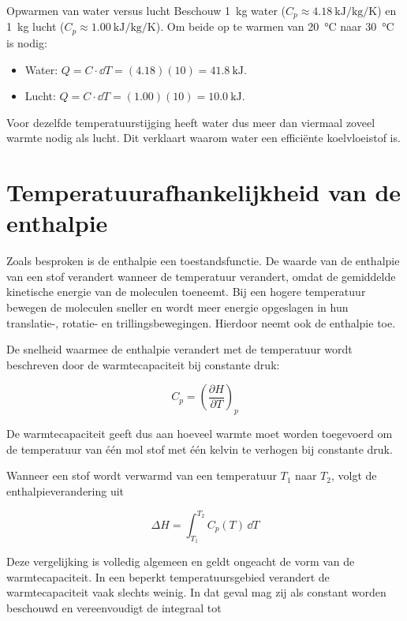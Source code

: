 \begin{voorbeeld}{Opwarmen van water versus lucht}
Beschouw \SI{1}{\kilogram} water ($C_p \approx \SI{4.18}{\kilo\joule\per\kilogram\per\kelvin}$) en \SI{1}{\kilogram} lucht ($C_p \approx \SI{1.00}{\kilo\joule\per\kilogram\per\kelvin}$). Om beide op te warmen van \SI{20}{\celsius} naar \SI{30}{\celsius} is nodig:
\begin{itemize}
\item Water: $Q = C \cdot \dd T = (4.18)(10) = \SI{41.8}{\kilo\joule}$.
\item Lucht: $Q = C \cdot \dd T = (1.00)(10) = \SI{10.0}{\kilo\joule}$.
\end{itemize}
Voor dezelfde temperatuurstijging heeft water dus meer dan viermaal zoveel warmte nodig als lucht. Dit verklaart waarom water een effici\"ente koelvloeistof is.
\end{voorbeeld}

\section{Temperatuurafhankelijkheid van de enthalpie}

Zoals besproken is de enthalpie een toestandsfunctie. De waarde van de enthalpie van een stof verandert wanneer de temperatuur verandert, omdat de gemiddelde kinetische energie van de moleculen toeneemt. Bij een hogere temperatuur bewegen de moleculen sneller en wordt meer energie opgeslagen in hun translatie-, rotatie- en trillingsbewegingen. Hierdoor neemt ook de enthalpie toe.

De snelheid waarmee de enthalpie verandert met de temperatuur wordt beschreven door de warmtecapaciteit bij constante druk:

\begin{equation}
C_p=\left(\frac{\partial H}{\partial T}\right)_p
\end{equation}

De warmtecapaciteit geeft dus aan hoeveel warmte moet worden toegevoerd om de temperatuur van één mol stof met één kelvin te verhogen bij constante druk.

Wanneer een stof wordt verwarmd van een temperatuur $T_1$ naar $T_2$, volgt de enthalpieverandering uit

\begin{equation}
\Delta H = \int_{T_1}^{T_2} C_p(T)\,\dd T
\end{equation}

Deze vergelijking is volledig algemeen en geldt ongeacht de vorm van de warmtecapaciteit. In een beperkt temperatuursgebied verandert de warmtecapaciteit vaak slechts weinig. In dat geval mag zij als constant worden beschouwd en vereenvoudigt de integraal tot

